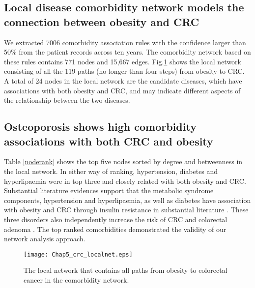 \subsection{Local disease comorbidity network models the connection between obesity and CRC}
We extracted 7006 comorbidity association rules with the confidence larger than 50\% from the patient records across ten years. The comorbidity network based on these  rules contains 771 nodes and 15,667 edges. Fig.\ref{localnet} shows the local network consisting of all the 119 paths (no longer than four steps) from obesity to CRC. A total of 24 nodes in the local network are the candidate diseases, which have associations with both obesity and CRC, and may indicate different aspects of the relationship between the two diseases.

\subsection{Osteoporosis shows high comorbidity associations with both CRC and obesity}
Table \ref{noderank} shows the top five nodes sorted by degree and betweenness in the local network. In either way of ranking, hypertension, diabetes and hyperlipaemia were in top three and closely related with both obesity and CRC. Substantial literature evidences support that the metabolic syndrome components, hypertension and hyperlipaemia, as well as diabetes have association with obesity and CRC through insulin resistance in substantial literature \cite{khaodhiar1999obesity,pollak2008insulin,leroith2003insulin,renehan2004insulin,komninou2003insulin}. These three disorders also independently increase the risk of CRC and colorectal adenoma \cite{khaodhiar1999obesity,berster2008type,komninou2003insulin}.
The top ranked comorbidities demonstrated the validity of our network analysis approach.
\begin{figure}[!ht]
\vspace{-0.6cm}
\begin{center}
\texttt{[image: Chap5\_crc\_localnet.eps]}
\end{center}
\vspace{-0.5cm}
\caption{
{The local network that contains all paths from obesity to colorectal cancer in the comorbidity network.}
}
\vspace{-0.5cm}
\label{localnet}
\end{figure}

